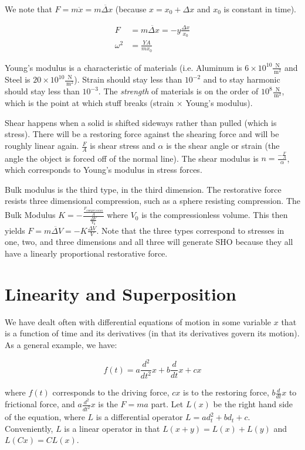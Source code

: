 \documentclass{report}
\newcommand{\unit}[1]{\ensuremath{\, \mathrm{#1}}}
\begin{document}
We note that $F = m\ddot{x} = m\ddot{\Delta x}$ (because $x = x_0 + \Delta x$ and $x_0$ is constant in time).

\begin{align*}
F &= m \ddot{\Delta x} = -y \frac{\Delta x}{x_0}\\
\omega^2 &= \frac{YA}{mx_0}
\end{align*}

Young's modulus is a characteristic of materials (i.e. Aluminum is $6 \times 10^10 \frac{\unit{N}}{\unit{m^2}}$ and Steel is $20 \times 10^10 \frac{\unit{N}}{\unit{m^2}}$). Strain should stay less than $10^{-2}$ and to stay harmonic should stay less than $10^{-3}$. The \emph{strength} of materials is on the order of $10^8 \frac{\unit{N}}{\unit{m^2}}$, which is the point at which stuff breaks (strain $\times$ Young's modulus).

Shear happens when a solid is shifted sideways rather than pulled (which is stress). There will be a restoring force against the shearing force and will be roughly linear again. $\frac{F}{A}$ is shear stress and $\alpha$ is the shear angle or strain (the angle the object is forced off of the normal line). The shear modulus is $n = \frac{-\frac{F}{A}}{\alpha}$, which corresponds to Young's modulus in stress forces.

Bulk modulus is the third type, in the third dimension. The restorative force resists three dimensional compression, such as a sphere resisting compression. The Bulk Modulus $K = -\frac{\frac{F_{compression}}{A}}{\frac{\Delta V}{V_0}}$ where $V_0$ is the compressionless volume. This then yields $F = m \ddot{\Delta V} = -K \frac{\Delta V}{V}$. Note that the three types correspond to stresses in one, two, and three dimensions and all three will generate SHO because they all have a linearly proportional restorative force.

\section{Linearity and Superposition}

We have dealt often with differential equations of motion in some variable $x$ that is a function of time and its derivatives (in that its derivatives govern its motion). As a general example, we have:

$$f(t) = a \frac{d^2}{dt^2}x + b\frac{d}{dt}x + cx$$

where $f(t)$ corresponds to the driving force, $cx$ is to the restoring force, $b\frac{d}{dt}x$ to frictional force, and $a\frac{d^2}{dt^2}x$ is the $F=ma$ part. Let $L(x)$ be the right hand side of the equation, where $L$ is a differential operator $L = ad_t^2 + bd_t + c$. Conveniently, $L$ is a linear operator in that $L(x+y) = L(x) + L(y)$ and $L(Cx) = CL(x)$. 
\end{document}
